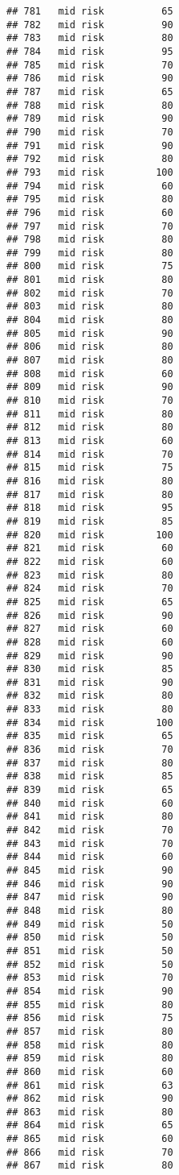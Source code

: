 \documentclass[
  ignorenonframetext,
]{beamer}
\begin{document}
\begin{frame}[fragile]
\begin{verbatim}
## 781   mid risk          65
## 782   mid risk          90
## 783   mid risk          80
## 784   mid risk          95
## 785   mid risk          70
## 786   mid risk          90
## 787   mid risk          65
## 788   mid risk          80
## 789   mid risk          90
## 790   mid risk          70
## 791   mid risk          90
## 792   mid risk          80
## 793   mid risk         100
## 794   mid risk          60
## 795   mid risk          80
## 796   mid risk          60
## 797   mid risk          70
## 798   mid risk          80
## 799   mid risk          80
## 800   mid risk          75
## 801   mid risk          80
## 802   mid risk          70
## 803   mid risk          80
## 804   mid risk          80
## 805   mid risk          90
## 806   mid risk          80
## 807   mid risk          80
## 808   mid risk          60
## 809   mid risk          90
## 810   mid risk          70
## 811   mid risk          80
## 812   mid risk          80
## 813   mid risk          60
## 814   mid risk          70
## 815   mid risk          75
## 816   mid risk          80
## 817   mid risk          80
## 818   mid risk          95
## 819   mid risk          85
## 820   mid risk         100
## 821   mid risk          60
## 822   mid risk          60
## 823   mid risk          80
## 824   mid risk          70
## 825   mid risk          65
## 826   mid risk          90
## 827   mid risk          60
## 828   mid risk          60
## 829   mid risk          90
## 830   mid risk          85
## 831   mid risk          90
## 832   mid risk          80
## 833   mid risk          80
## 834   mid risk         100
## 835   mid risk          65
## 836   mid risk          70
## 837   mid risk          80
## 838   mid risk          85
## 839   mid risk          65
## 840   mid risk          60
## 841   mid risk          80
## 842   mid risk          70
## 843   mid risk          70
## 844   mid risk          60
## 845   mid risk          90
## 846   mid risk          90
## 847   mid risk          90
## 848   mid risk          80
## 849   mid risk          50
## 850   mid risk          50
## 851   mid risk          50
## 852   mid risk          50
## 853   mid risk          70
## 854   mid risk          90
## 855   mid risk          80
## 856   mid risk          75
## 857   mid risk          80
## 858   mid risk          80
## 859   mid risk          80
## 860   mid risk          60
## 861   mid risk          63
## 862   mid risk          90
## 863   mid risk          80
## 864   mid risk          65
## 865   mid risk          60
## 866   mid risk          70
## 867   mid risk          80

\end{verbatim}
\end{frame}
\end{document}
